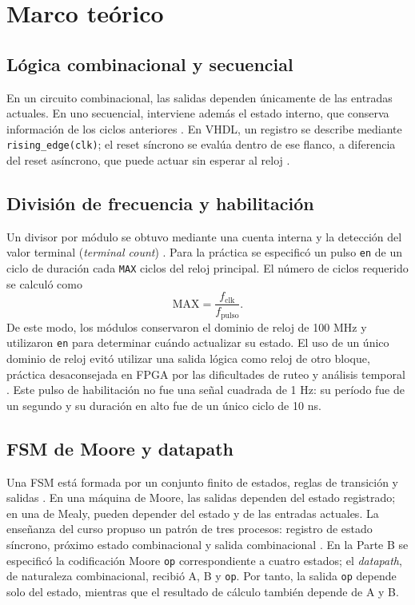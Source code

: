\section{Marco teórico}
\subsection{Lógica combinacional y secuencial}
En un circuito combinacional, las salidas dependen únicamente de las entradas actuales. En uno secuencial, interviene además el estado interno, que conserva información de los ciclos anteriores \cite{cursofsm}. En VHDL, un registro se describe mediante \texttt{rising\_edge(clk)}; el reset síncrono se evalúa dentro de ese flanco, a diferencia del reset asíncrono, que puede actuar sin esperar al reloj \cite{ug901}. 

\subsection{División de frecuencia y habilitación}
Un divisor por módulo se obtuvo mediante una cuenta interna y la detección del valor terminal (\emph{terminal count}) \cite{cursodiv}. Para la práctica se especificó un pulso \texttt{en} de un ciclo de duración cada \texttt{MAX} ciclos del reloj principal. El número de ciclos requerido se calculó como
\begin{equation}
\mathrm{MAX}=\frac{f_{\mathrm{clk}}}{f_{\mathrm{pulso}}}.
\label{eq:max}
\end{equation}
De este modo, los módulos conservaron el dominio de reloj de 100 MHz y utilizaron \texttt{en} para determinar cuándo actualizar su estado. El uso de un único dominio de reloj evitó utilizar una salida lógica como reloj de otro bloque, práctica desaconsejada en FPGA por las dificultades de ruteo y análisis temporal \cite{cursodiv}. Este pulso de habilitación no fue una señal cuadrada de 1 Hz: su período fue de un segundo y su duración en alto fue de un único ciclo de 10 ns.

\subsection{FSM de Moore y datapath}
Una FSM está formada por un conjunto finito de estados, reglas de transición y salidas \cite{cursofsm}. En una máquina de Moore, las salidas dependen del estado registrado; en una de Mealy, pueden depender del estado y de las entradas actuales. La enseñanza del curso propuso un patrón de tres procesos: registro de estado síncrono, próximo estado combinacional y salida combinacional \cite{cursofsm}. En la Parte B se especificó la codificación Moore \texttt{op} correspondiente a cuatro estados; el \emph{datapath}, de naturaleza combinacional, recibió A, B y \texttt{op}. Por tanto, la salida \texttt{op} depende solo del estado, mientras que el resultado de cálculo también depende de A y B.

